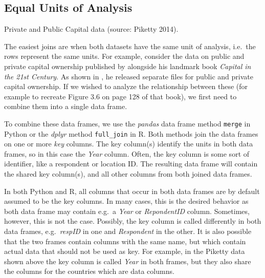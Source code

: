\subsection{Equal Units of Analysis}

\begin{ccsexample}
\caption{Private and Public Capital data (source: Piketty 2014).}\label{ex:piketty}
\end{ccsexample}


The easiest joins are when both datasets have the same unit of analysis,
i.e.\ the rows represent the same units.
For example, consider the data on public and private capital ownership published by
\cite{piketty} alongside his landmark book \emph{Capital in the 21st Century}.
As shown in , he released separate files for public and private capital ownership.
If we wished to analyze the relationship between these (for example to recreate Figure 3.6 on page 128 of that book),
we first need to combine them into a single data frame.

To combine these data frames, we use the \emph{pandas} data frame method \texttt{merge} in Python or the \emph{dplyr} method \texttt{full\_join} in R.
Both methods join the data frames on one or more \emph{key} columns.
The key column(s) identify the units in both data frames, so in this case the \emph{Year} column.
Often, the key column is some sort of identifier, like a respondent or location ID.
The resulting data frame will contain the shared key column(s), and all other columns from both joined data frames.

In both Python and R, all columns that occur in both data frames are by default assumed to be the key columns.
In many cases, this is the desired behavior as both data frame may contain e.g.\ a \emph{Year} or \emph{RepondentID} column.
Sometimes, however, this is not the case.
Possibly, the key column is called differently in both data frames, e.g.\ \emph{respID} in one and \emph{Respondent} in the other.
It is also possible that the two frames contain columns with the same name,
but which contain actual data that should not be used as key.
For example, in the Piketty data shown above the key column is called \emph{Year} in both frames,
but they also share the columns for the countries which are data columns.


